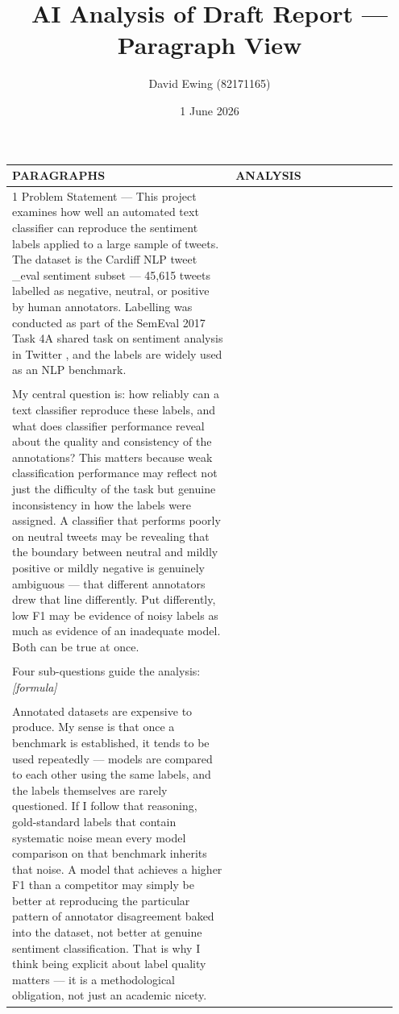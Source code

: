 \documentclass[11pt]{article}
\title{AI Analysis of Draft Report --- Paragraph View}
\author{David Ewing (82171165)}
\date{1 June 2026}
\begin{document}
\maketitle
\thispagestyle{empty}
\newpage

\setlength{\LTleft}{0pt}
\setlength{\LTright}{0pt}
\begin{longtable}{|p{0.55\linewidth}|p{0.40\linewidth}|}
\hline
\centering\textbf{PARAGRAPHS} & \centering\textbf{ANALYSIS} \tabularnewline[2pt]
\hline
\endhead
1 Problem Statement --- This project examines how well an automated text classifier can reproduce the sentiment labels applied to a large sample of tweets. The dataset is the Cardiff NLP tweet \_eval sentiment subset --- 45,615 tweets labelled as negative, neutral, or positive by human annotators. Labelling was conducted as part of the SemEval 2017 Task 4A shared task on sentiment analysis in Twitter , and the labels are widely used as an NLP benchmark. & \\[2pt]
\hline
\rule{0pt}{3.5cm} & \\
\hline
My central question is: how reliably can a text classifier reproduce these labels, and what does classifier performance reveal about the quality and consistency of the annotations? This matters because weak classification performance may reflect not just the difficulty of the task but genuine inconsistency in how the labels were assigned. A classifier that performs poorly on neutral tweets may be revealing that the boundary between neutral and mildly positive or mildly negative is genuinely ambiguous --- that different annotators drew that line differently. Put differently, low F1 may be evidence of noisy labels as much as evidence of an inadequate model. Both can be true at once. & \\[2pt]
\hline
\rule{0pt}{3.5cm} & \\
\hline
Four sub-questions guide the analysis: \textit{[formula]} & \\[2pt]
\hline
\rule{0pt}{3.5cm} & \\
\hline
Annotated datasets are expensive to produce. My sense is that once a benchmark is established, it tends to be used repeatedly --- models are compared to each other using the same labels, and the labels themselves are rarely questioned. If I follow that reasoning, gold-standard labels that contain systematic noise mean every model comparison on that benchmark inherits that noise. A model that achieves a higher F1 than a competitor may simply be better at reproducing the particular pattern of annotator disagreement baked into the dataset, not better at genuine sentiment classification. That is why I think being explicit about label quality matters --- it is a methodological obligation, not just an academic nicety. & \\[2pt]

\end{longtable}
\end{document}
